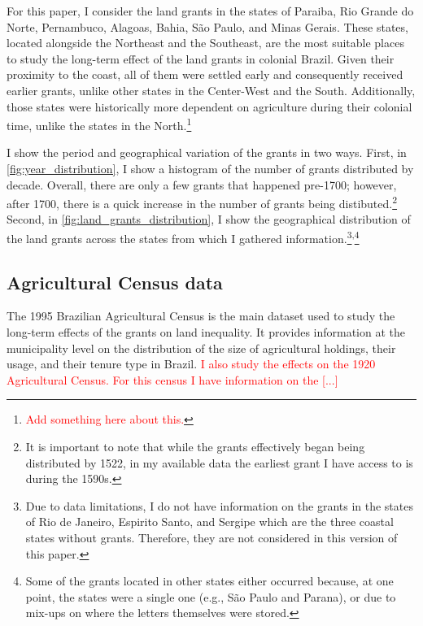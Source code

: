 \documentclass[11pt]{article}
\newcommand{\red}[1]{\textcolor{red}{#1}}
\begin{document}
For this paper, I consider the land grants in the states of Paraiba, Rio Grande do Norte, Pernambuco, Alagoas, Bahia, São Paulo, and Minas Gerais.
These states, located alongside the Northeast and the Southeast, are the most suitable places to study the long-term effect of the land grants in colonial Brazil.
Given their proximity to the coast, all of them were settled early and consequently received earlier grants, unlike other states in the Center-West and the South.
Additionally, those states were historically more dependent on agriculture during their colonial time, unlike the states in the North.\footnote{\red{Add something here about this.}}

I show the period and geographical variation of the grants in two ways.
First, in \autoref{fig:year_distribution}, I show a histogram of the number of grants distributed by decade. 
Overall, there are only a few grants that happened pre-1700; however, after 1700, there is a quick increase in the number of grants being distibuted.\footnote{It is important to note that while the grants effectively began being distributed by 1522, in my available data the earliest grant I have access to is during the 1590s.}
Second, in \autoref{fig:land_grants_distribution}, I show the geographical distribution of the land grants across the states from which I gathered information.\footnote{Due to data limitations, I do not have information on the grants in the states of Rio de Janeiro, Espirito Santo, and Sergipe which are the three coastal states without grants. Therefore, they are not considered in this version of this paper.}\textsuperscript{,}\footnote{Some of the grants located in other states either occurred because, at one point, the states were a single one (e.g., São Paulo and Parana), or due to mix-ups on where the letters themselves were stored.}


\subsection{Agricultural Census data}

The 1995 Brazilian Agricultural Census is the main dataset used to study the long-term effects of the grants on land inequality.
It provides information at the municipality level on the distribution of the size of agricultural holdings, their usage, and their tenure type in Brazil. %
\red{I also study the effects on the 1920 Agricultural Census. For this census I have information on the [...]}
\end{document}
